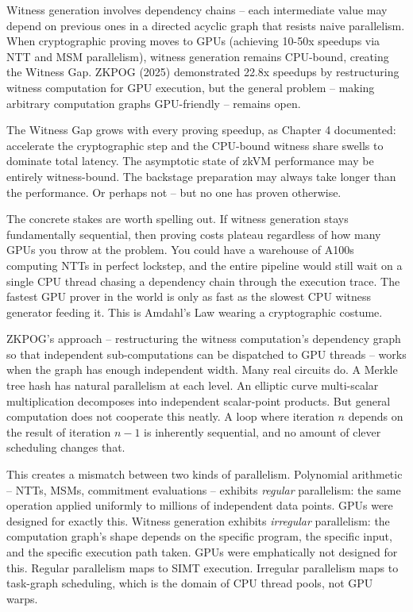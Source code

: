 \documentclass[
  11pt,
  openany]{report}
\begin{document}
Witness generation involves dependency chains -- each intermediate value may
depend on previous ones in a directed acyclic graph that resists naive
parallelism. When cryptographic proving moves to GPUs (achieving 10-50x speedups
via NTT and MSM parallelism), witness generation remains CPU-bound, creating the
Witness Gap. ZKPOG (2025) demonstrated 22.8x speedups by restructuring witness
computation for GPU execution, but the general problem -- making arbitrary
computation graphs GPU-friendly -- remains open.

The Witness Gap grows with every proving speedup, as Chapter 4 documented:
accelerate the cryptographic step and the CPU-bound witness share swells to
dominate total latency. The asymptotic state of zkVM performance may be entirely
witness-bound. The backstage preparation may always take longer than the
performance. Or perhaps not -- but no one has proven otherwise.

The concrete stakes are worth spelling out. If witness generation stays
fundamentally sequential, then proving costs plateau regardless of how many GPUs
you throw at the problem. You could have a warehouse of A100s computing NTTs in
perfect lockstep, and the entire pipeline would still wait on a single CPU
thread chasing a dependency chain through the execution trace. The fastest GPU
prover in the world is only as fast as the slowest CPU witness generator feeding
it. This is Amdahl's Law wearing a cryptographic costume.

ZKPOG's approach -- restructuring the witness computation's dependency graph so
that independent sub-computations can be dispatched to GPU threads -- works when
the graph has enough independent width. Many real circuits do. A Merkle tree
hash has natural parallelism at each level. An elliptic curve multi-scalar
multiplication decomposes into independent scalar-point products. But general
computation does not cooperate this neatly. A loop where iteration \(n\) depends
on the result of iteration \(n-1\) is inherently sequential, and no amount of
clever scheduling changes that.

This creates a mismatch between two kinds of parallelism. Polynomial arithmetic
-- NTTs, MSMs, commitment evaluations -- exhibits \emph{regular} parallelism:
the same operation applied uniformly to millions of independent data points.
GPUs were designed for exactly this. Witness generation exhibits
\emph{irregular} parallelism: the computation graph's shape depends on the
specific program, the specific input, and the specific execution path taken.
GPUs were emphatically not designed for this. Regular parallelism maps to SIMT
execution. Irregular parallelism maps to task-graph scheduling, which is the
domain of CPU thread pools, not GPU warps.
\end{document}

